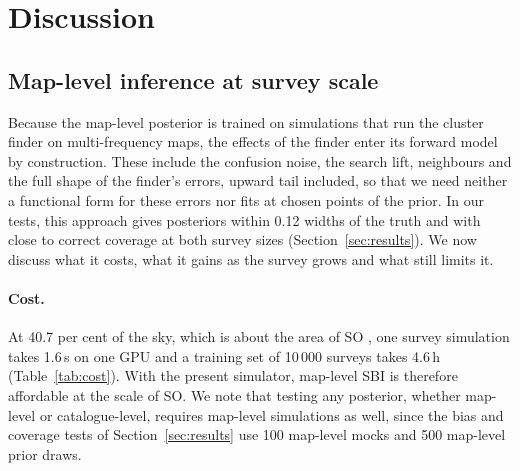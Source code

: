 \section{Discussion}\label{sec:discussion}

\subsection{Map-level inference at survey scale}\label{sec:discussion:maplevel}

Because the map-level posterior is trained on simulations that run the cluster finder on multi-frequency
maps, the effects of the finder enter its forward model by construction. These include the confusion
noise, the search lift, neighbours and the full shape of the finder's errors, upward tail included, so that
we need neither a functional form for these errors nor fits at chosen points of the prior. In our tests,
this approach gives posteriors within 0.12 widths of the truth and with close to correct coverage at both
survey sizes (Section~\ref{sec:results}). We now discuss what it costs, what it gains as the survey grows
and what still limits it.

\paragraph*{Cost.} At 40.7 per cent of the sky, which is about the area of SO \citep{SO2019}, one survey
simulation takes 1.6\,s on one GPU and a training set of 10\,000 surveys takes 4.6\,h
(Table~\ref{tab:cost}). With the present simulator, map-level SBI is therefore affordable at the scale of
SO. We note that testing any posterior, whether map-level or catalogue-level, requires map-level
simulations as well, since the bias and coverage tests of Section~\ref{sec:results} use 100 map-level mocks
and 500 map-level prior draws.

